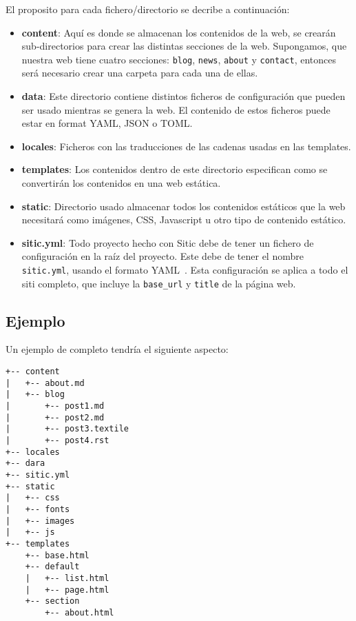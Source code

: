 El proposito para cada fichero/directorio se decribe a continuación:

\begin{itemize}
    \item \textbf{content}: Aquí es donde se almacenan los contenidos de la web, se crearán
        sub-directorios para crear las distintas secciones de la web. Supongamos, que nuestra web
        tiene cuatro secciones: \texttt{blog}, \texttt{news}, \texttt{about} y \texttt{contact},
        entonces será necesario crear una carpeta para cada una de ellas.
    \item \textbf{data}: Este directorio contiene distintos ficheros de configuración que pueden
        ser usado mientras se genera la web. El contenido de estos ficheros puede estar en format
        YAML, JSON o TOML.
    \item \textbf{locales}: Ficheros con las traducciones de las cadenas usadas en las templates.
    \item \textbf{templates}: Los contenidos dentro de este directorio especifican como se convertirán
        los contenidos en una web estática.
    \item \textbf{static}: Directorio usado almacenar todos los contenidos estáticos que la web
        necesitará como imágenes, CSS, Javascript u otro tipo de contenido estático.
    \item \textbf{sitic.yml}: Todo proyecto hecho con Sitic debe de tener un fichero
        de configuración en la raíz del proyecto. Este debe de tener el nombre \texttt{sitic.yml},
        usando el formato YAML~\cite{yaml}. Esta configuración se aplica a todo el siti completo,
        que incluye la \texttt{base\_url} y \texttt{title} de la página web.
\end{itemize}

\subsection{Ejemplo}
Un ejemplo de completo tendría el siguiente aspecto:

\begin{verbatim}
+-- content
|   +-- about.md
|   +-- blog
|       +-- post1.md
|       +-- post2.md
|       +-- post3.textile
|       +-- post4.rst
+-- locales
+-- dara
+-- sitic.yml
+-- static
|   +-- css
|   +-- fonts
|   +-- images
|   +-- js
+-- templates
    +-- base.html
    +-- default
    |   +-- list.html
    |   +-- page.html
    +-- section
        +-- about.html
\end{verbatim}

